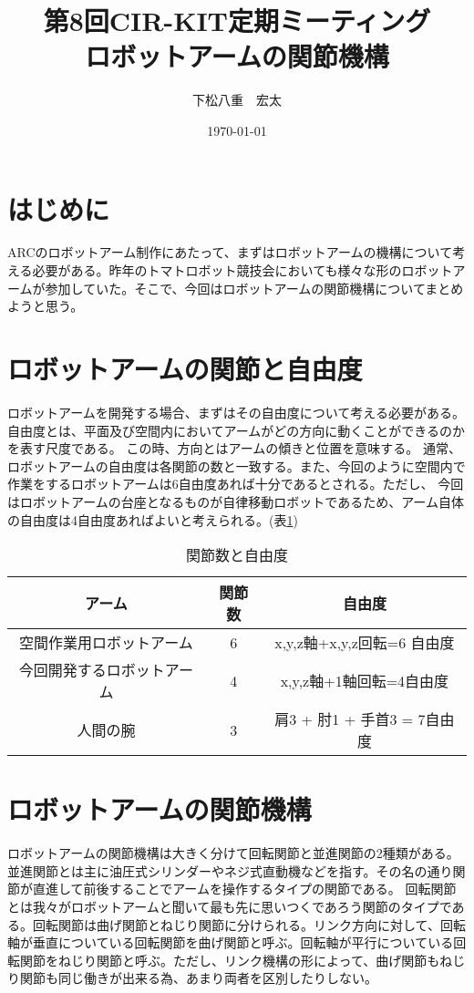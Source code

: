 \documentclass[12pt,a4j]{jarticle}
\title {第8回CIR-KIT定期ミーティング\\ロボットアームの関節機構}
\author {下松八重　宏太}
\date {\today}
\begin{document}
\maketitle

\section{はじめに}
ARCのロボットアーム制作にあたって、まずはロボットアームの機構について考える必要がある。昨年のトマトロボット競技会においても様々な形のロボットアームが参加していた。そこで、今回はロボットアームの関節機構についてまとめようと思う。

\section{ロボットアームの関節と自由度}
ロボットアームを開発する場合、まずはその自由度について考える必要がある。
自由度とは、平面及び空間内においてアームがどの方向に動くことができるのかを表す尺度である。
この時、方向とはアームの傾きと位置を意味する。
通常、ロボットアームの自由度は各関節の数と一致する。また、今回のように空間内で作業をするロボットアームは6自由度あれば十分であるとされる。ただし、
今回はロボットアームの台座となるものが自律移動ロボットであるため、アーム自体の自由度は4自由度あればよいと考えられる。(表\ref{tab:arm})
 
\begin{table}[htb]
\begin{center}
  \caption{関節数と自由度}
  \begin{tabular}{|c|c|c|} \hline
  アーム&関節数 &自由度 \\ \hline \hline
  空間作業用ロボットアーム&6&x,y,z軸+x,y,z回転=6
	  自由度\\ \hline
  今回開発するロボットアーム& 4&x,y,z軸+1軸回転=4自由度\\ \hline
  人間の腕&3& 肩3 + 肘1 + 手首3 = 7自由度\\ \hline
  \end{tabular}
\label{tab:arm}
\end{center}
\end{table}



\newpage
\section{ロボットアームの関節機構}
ロボットアームの関節機構は大きく分けて回転関節と並進関節の2種類がある。並進関節とは主に油圧式シリンダーやネジ式直動機などを指す。その名の通り関節が直進して前後することでアームを操作するタイプの関節である。
回転関節とは我々がロボットアームと聞いて最も先に思いつくであろう関節のタイプである。回転関節は曲げ関節とねじり関節に分けられる。リンク方向に対して、回転軸が垂直についている回転関節を曲げ関節と呼ぶ。回転軸が平行についている回転関節をねじり関節と呼ぶ。ただし、リンク機構の形によって、曲げ関節もねじり関節も同じ働きが出来る為、あまり両者を区別したりしない。
\end{document}
